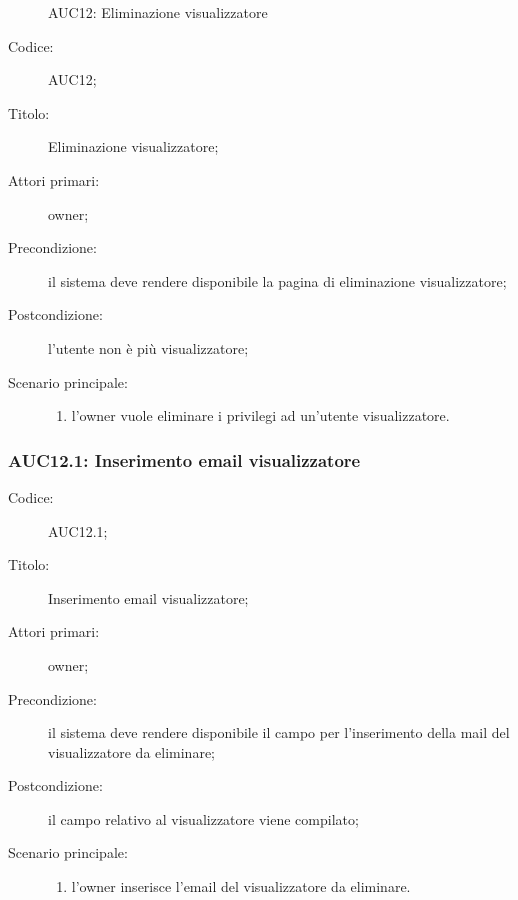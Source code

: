 \documentclass[../../../analisi-dei-requisiti.tex]{subfiles}
\begin{document}
\begin{figure}[H]
  \centering
  \caption{AUC12: Eliminazione visualizzatore}%
  \label{fig:AUC12}
\end{figure}

\begin{description}
  \item[Codice:] AUC12;
  \item[Titolo:] Eliminazione visualizzatore;
  \item[Attori primari:] owner;
  \item[Precondizione:] il sistema deve rendere disponibile la pagina di eliminazione visualizzatore;
  \item[Postcondizione:] l'utente non è più visualizzatore;
  \item[Scenario principale:]
        \begin{enumerate}
          \item l'owner vuole eliminare i privilegi ad un'utente visualizzatore.
        \end{enumerate}
\end{description}

\subsubsection{AUC12.1: Inserimento email visualizzatore}%
\label{subs:AUC12.1}
\begin{description}
  \item[Codice:] AUC12.1;
  \item[Titolo:] Inserimento email visualizzatore;
  \item[Attori primari:] owner;
  \item[Precondizione:] il sistema deve rendere disponibile il campo per l'inserimento della mail del visualizzatore da eliminare;
  \item[Postcondizione:] il campo relativo al visualizzatore viene compilato;
  \item[Scenario principale:]
        \begin{enumerate}
          \item l'owner inserisce l'email del visualizzatore da eliminare.
        \end{enumerate}
\end{description}
\end{document}
